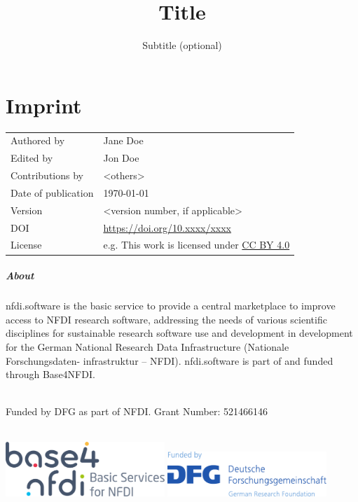 \documentclass[headsepline,titlepage,twoside,12pt]{scrreprt}
\author{\theauthor}
\date{\thedate}
\title{Title}
\subtitle{Subtitle (optional)}
\newcommand{\thedate}{\today}
\newcommand{\theauthor}{Jane Doe}
\newcommand{\theeditor}{Jon Doe}
\begin{document}
\allowdisplaybreaks%


\maketitle

\chapter*{Imprint}\label{ch:introduction}

\begin{tabular}{ll}
Authored by			&\theauthor\\
Edited by			&\theeditor\\
Contributions by	&<others>\\
Date of publication	&\thedate\\
Version				&<version number, if applicable>\\
DOI					&\url{https://doi.org/10.xxxx/xxxx}\\
License				&e.g. This work is licensed under \href{https://creativecommons.org/licenses/by/4.0/}{CC BY 4.0}\\
\end{tabular}

\paragraph{About}
nfdi.software is the basic service to provide a central marketplace to improve access to NFDI research software, addressing the needs of various scientific disciplines for sustainable research software use and development in development for the German National Research Data Infrastructure (Nationale Forschungsdaten-
infrastruktur – NFDI).
nfdi.software is part of and funded through Base4NFDI.

~\\
Funded by DFG as part of NFDI. Grant Number: 521466146

~\\
\includegraphics[width=6cm]{img/base.png}
\hfill
\includegraphics[width=6cm]{img/dfg.pdf}
\end{document}
